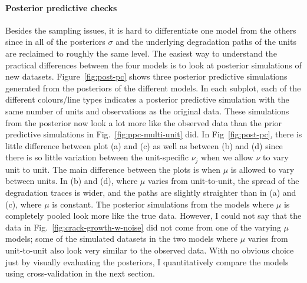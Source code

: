 \paragraph{Posterior predictive checks} Besides the sampling issues, it is hard to differentiate one model from the others since in all of the posteriors $\sigma$ and the underlying degradation paths of the units are reclaimed to roughly the same level. The easiest way to understand the practical differences between the four models is to look at posterior simulations of new datasets. Figure~\ref{fig:post-pc} shows three posterior predictive simulations generated from the posteriors of the different models. In each subplot, each of the different colours/line types indicates a posterior predictive simulation with the same number of units and observations as the original data. These simulations from the posterior now look a lot more like the observed data than the prior predictive simulations in Fig.~\ref{fig:ppc-multi-unit} did. In Fig~\ref{fig:post-pc}, there is little difference between plot (a) and (c) as well as between (b) and (d) since there is so little variation between the unit-specific $\nu_j$ when we allow $\nu$ to vary unit to unit. The main difference between the plots is when $\mu$ is allowed to vary between units. In (b) and (d), where $\mu$ varies from unit-to-unit, the spread of the degradation traces is wider, and the paths are slightly straighter than in (a) and (c), where $\mu$ is constant. The posterior simulations from the models where $\mu$ is completely pooled look more like the true data. However, I could not say that the data in Fig.~\ref{fig:crack-growth-w-noise} did not come from one of the varying $\mu$ models; some of the simulated datasets in the two models where $\mu$ varies from unit-to-unit also look very similar to the observed data. With no obvious choice just by visually evaluating the posteriors, I quantitatively compare the models using cross-validation in the next section.

